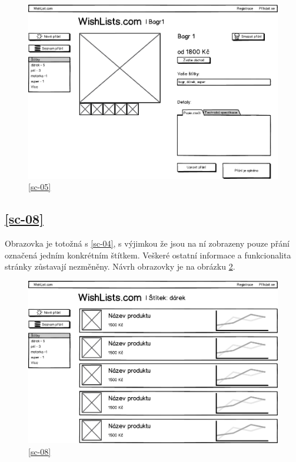 \begin{figure}[htb]
\begin{center}
\includegraphics[width=130mm]{./pictures/mock/editace-detail-prani.png}
\caption{\ref{sc-05}}
\label{fig:editace-detail-prani}
\end{center}
\end{figure}

\subsection{\ref{sc-08}}
\label{sec:prani-podle-stitku}
Obrazovka je totožná s \ref{sc-04}, s výjimkou že jsou na ní zobrazeny pouze přání označená jedním konkrétním štítkem. Veškeré ostatní informace a funkcionalita stránky zůstavají nezměněny. Návrh obrazovky je na obrázku \ref{fig:prani-oznacena-tagem}.

\begin{figure}[htb]
\begin{center}
\includegraphics[width=130mm]{./pictures/mock/prani-oznacena-tagem.png}
\caption{\ref{sc-08}}
\label{fig:prani-oznacena-tagem}
\end{center}
\end{figure}

